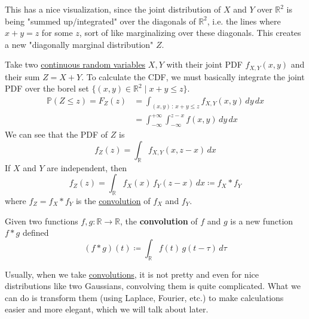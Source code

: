   This has a nice visualization, since the joint distribution of $X$ and $Y$ over $\mathbb{R}^2$ is being "summed up/integrated" over the diagonals of $\mathbb{R}^2$, i.e. the lines where $x + y = z$ for some $z$, sort of like marginalizing over these diagonals. This creates a new "diagonally marginal distribution" $Z$. 

  \begin{definition}
    \label{def:sums-of-continuous-random-variables}
    Take two \hyperref[def:continuous-random-variable]{continuous random variables} $X, Y$ with their joint PDF $f_{X, Y} (x, y)$ and their sum $Z = X + Y$. To calculate the CDF, we must basically integrate the joint PDF over the borel set $\{(x, y) \in \mathbb{R}^2 \mid x + y \leq z\}$. 
    \begin{align*}
      \mathbb{P}(Z \leq z) = F_Z (z) & = \int_{(x, y) \,:\, x + y \leq z} f_{X, Y} (x, y) \,dy\,dx \\
      & = \int_{-\infty}^{+\infty} \int_{-\infty}^{z - x} f(x, y) \,dy \,dx
    \end{align*}
    We can see that the PDF of $Z$ is 
    \begin{equation}
      f_{Z} (z) = \int_{\mathbb{R}} f_{X, Y} (x, z - x) \, dx
    \end{equation}
    If $X$ and $Y$ are independent, then 
    \begin{equation}
      f_{Z} (z) = \int_{\mathbb{R}} f_{X} (x) \, f_Y (z - x) \,dx \coloneqq f_X \ast f_Y
    \end{equation}
    where $f_Z = f_X \ast f_Y$ is the \hyperref[real-thm:convolution]{convolution} of $f_X$ and $f_Y$. 
  \end{definition}

  \begin{definition}[Convolution]
    \label{def:convolution}
    Given two functions $f, g: \mathbb{R} \to \mathbb{R}$, the \textbf{convolution} of $f$ and $g$ is a new function $f \ast g$ defined  
    \begin{equation}
      (f \ast g) (t) \coloneqq \int_\mathbb{R} f(t)\, g(t - \tau) \, d \tau
    \end{equation}
  \end{definition}

  Usually, when we take \hyperref[def:convolution]{convolutions}, it is not pretty and even for nice distributions like two Gaussians, convolving them is quite complicated. What we can do is transform them (using Laplace, Fourier, etc.) to make calculations easier and more elegant, which we will talk about later.  

